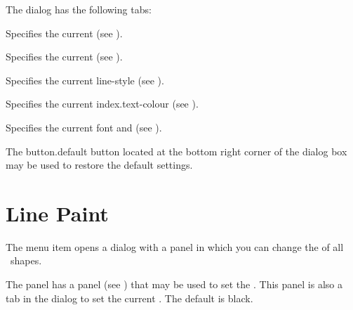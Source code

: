 The  dialog has the following tabs:
\begin{deflist}
\begin{itemdesc}
Specifies the current  (see
).
\end{itemdesc}

\begin{itemdesc}
Specifies the current  (see
).
\end{itemdesc}

\begin{itemdesc}
Specifies the current \gls{line-style} (see
).
\end{itemdesc}

\begin{itemdesc}
Specifies the current \gls{index.text-colour} (see
).
\end{itemdesc}

\begin{itemdesc}
Specifies the current \gls{font} and  (see
).
\end{itemdesc}

\end{deflist}

The \gls{button.default} button located at the bottom right corner
of the dialog box may be used to restore the default settings.

\section{Line Paint}\label{sec:linepaint}


The  menu item opens a dialog
with a  panel in which
you can change the  
of all \selected\ \glspl{shape}.


The  panel has a  panel
(see ) that may be used to set the 
. This panel is also a tab
in the  dialog to set the current
.
The default  is black.

